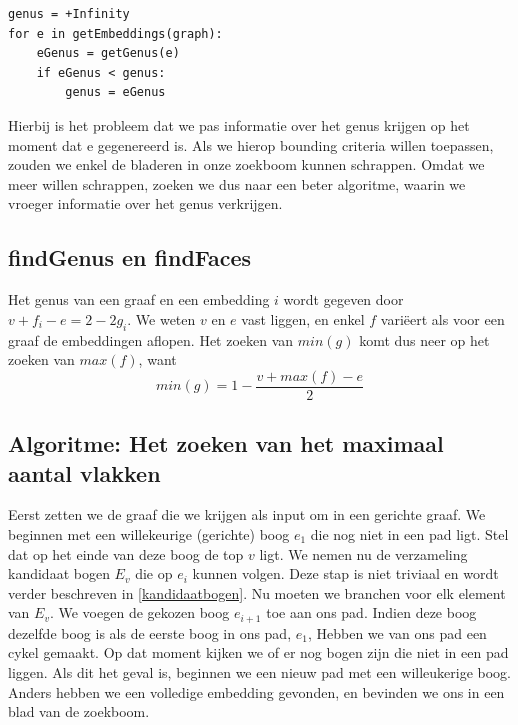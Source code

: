 \documentclass{article}
\begin{document}
\lstset{language=Python}
\begin{lstlisting}
genus = +Infinity
for e in getEmbeddings(graph):
    eGenus = getGenus(e)
    if eGenus < genus:
        genus = eGenus
\end{lstlisting}

Hierbij is het probleem dat we pas informatie over het genus krijgen op het
moment dat e gegenereerd is. Als we hierop bounding criteria willen toepassen,
zouden we enkel de bladeren in onze zoekboom kunnen schrappen. Omdat we meer
willen schrappen, zoeken we dus naar een beter algoritme, waarin we vroeger
informatie over het genus verkrijgen.
\newline

\subsection{findGenus en findFaces}
Het genus van een graaf en een embedding $i$ wordt gegeven door
$v + f_i - e = 2 - 2g_i$. We weten $v$ en $e$ vast liggen, en enkel $f$ vari\"eert
als voor een graaf de embeddingen aflopen. Het zoeken van $min(g)$ komt dus
neer op het zoeken van $max(f)$, want
\begin{equation*}
min(g) = 1 - \frac{v + max(f) - e}{2}
\end{equation*}

\subsection{Algoritme: Het zoeken van het maximaal aantal vlakken}
Eerst zetten we de graaf die we krijgen als input om in een gerichte graaf. We
beginnen met een willekeurige (gerichte) boog $e_1$ die nog niet in een pad
ligt.  Stel dat op het einde van deze boog de top $v$ ligt. We nemen nu de
verzameling kandidaat bogen $E_v$ die op $e_i$ kunnen volgen. Deze stap is niet
triviaal en wordt verder beschreven in \ref{kandidaatbogen}. Nu moeten we branchen
voor elk element van $E_v$. We voegen de gekozen boog $e_{i+1}$ toe aan ons pad.
Indien deze boog dezelfde boog is als de eerste boog in ons pad, $e_1$, Hebben
we van ons pad een cykel gemaakt. Op dat moment kijken we of er nog bogen zijn
die niet in een pad liggen. Als dit het geval is, beginnen we een nieuw pad met
een willeukerige boog. Anders hebben we een volledige embedding gevonden, en
bevinden we ons in een blad van de zoekboom.
\newline
\end{document}
